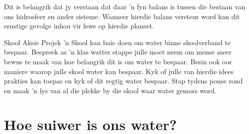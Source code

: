       \label{m38138*id342412}Dit is belangrik dat jy verstaan dat daar  'n fyn balans is tussen die bestaan van ons hidrosfeer en ander sisteme. Wanneer hierdie balans versteur word kan dit ernstige gevolge inhou vir lewe op hierdie planeet.
\label{m38138*secfhsst!!!underscore!!!id1065}
            \begin{project}{Skool Aksie Projek
      }
            \nopagebreak
 'n Skool kan baie doen om water binne skoolverband te bespaar. Bespreek as  'n klas watter stappe julle moet neem om mense meer bewus te maak van hoe belangrik dit is om water te bespaar. Besin ook oor maniere waarop julle skool water kan bespaar. Kyk of julle van hierdie idees prakties kan toepas en kyk of dit regtig water bespaar. Stap tydens pouse rond en maak  'n lys van al die plekke by die skool waar water gemors word.
\end{project}

\section{Hoe suiwer is ons water?}
            \nopagebreak

